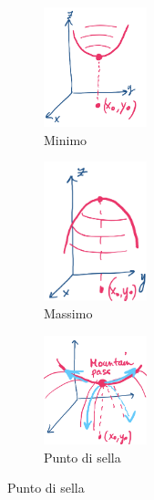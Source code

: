 \begin{figure}[h!]
\vspace{-10pt}
\centering
\begin{subfigure}{.3\textwidth}
    \centering
    \includegraphics[width=3cm]{images/min-hessiano.png}
    \caption{Minimo}
\end{subfigure}
\begin{subfigure}{.3\textwidth}
    \centering
    \includegraphics[width=3cm]{images/max-hessiano.png}
    \caption{Massimo}
\end{subfigure}
\begin{subfigure}{.3\textwidth}
    \centering
    \includegraphics[width=3cm]{images/sella-hessiano.png}
    \caption{Punto di sella}
\end{subfigure}
\end{figure}

